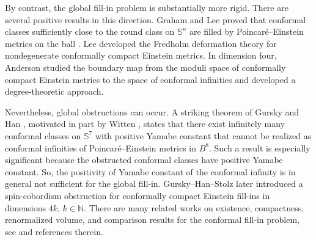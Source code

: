 \documentclass[11pt,letterpaper]{amsart}
\theoremstyle{definition}
\theoremstyle{remark}
\numberwithin{equation}{section}
\newcommand{\Sph}{\mathbb S}
\begin{document}
By contrast, the global fill-in problem is substantially more rigid. There are several positive results in this direction.  Graham and Lee proved that conformal classes sufficiently close to the round class on $\Sph^n$ are filled by Poincar\'e--Einstein metrics on the ball \cite{GrahamLee}.  Lee \cite{LeeFredholm} developed the Fredholm deformation theory for nondegenerate conformally compact Einstein metrics.  In dimension four, Anderson \cite{AndersonTopics} studied the boundary map from the moduli space of conformally compact Einstein metrics to the space of conformal infinities and developed a degree-theoretic approach.  

Nevertheless, global obstructions can occur. A striking theorem of Gursky and Han \cite{GurskyHan}, motivated in part by Witten \cite{Witten}, states that there exist infinitely many conformal classes on $\Sph^7$ with positive Yamabe constant that cannot be realized as conformal infinities of Poincar\'e--Einstein metrics in $B^8$. Such a result is especially significant because the obstructed conformal classes have positive Yamabe constant. So, the positivity of Yamabe constant of the conformal infinity is in general not sufficient for the global fill-in. Gursky--Han--Stolz  \cite{GurskyHanStolz} later introduced a spin-cobordism obstruction for conformally compact Einstein fill-ins in dimensions $4k$, $k\in \mathbb{N}$.  There are many related works on existence, compactness, renormalized volume, and comparison results for the conformal fill-in problem, see \cite{ChangGeCompactness,ChangGefilling,ChangGeQing,Chang_2024,Chang2025Poincare,LiQingShi,lee2025rigidity,qing2003rigidity,WangWang,wang2025sharp,wang2023note,wang2026lower} and references therein.
\end{document}
